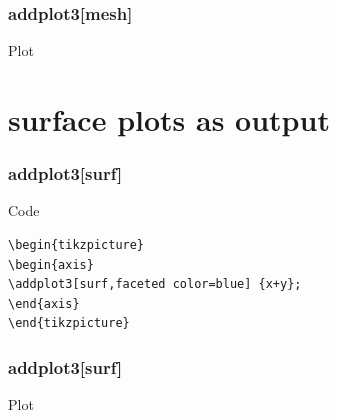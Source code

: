 \documentclass{beamer}
\begin{document}
\begin{frame}[fragile]
\frametitle{\color{blue} addplot3[mesh]}
\begin{block}{Plot}
\end{block}
\end{frame}
\section{surface plots as output}
\begin{frame}[fragile]
\frametitle{\color{blue} addplot3[surf]}
\begin{block}{Code}
\begin{verbatim}
\begin{tikzpicture}
\begin{axis}
\addplot3[surf,faceted color=blue] {x+y};
\end{axis}
\end{tikzpicture}
\end{verbatim}
\end{block}
\end{frame}
\begin{frame}[fragile]
\frametitle{\color{blue} addplot3[surf]}
\begin{block}{Plot}
\end{block}
\end{frame}
\end{document}
